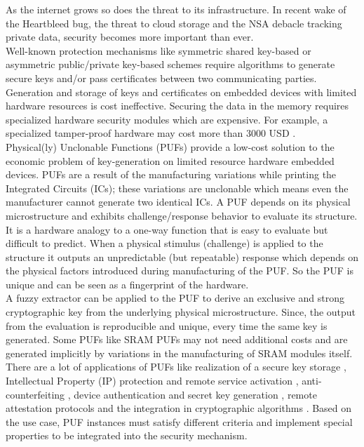 As the internet grows so does the threat to its infrastructure.
In recent wake of the Heartbleed bug, the threat to cloud storage and the NSA debacle tracking private data, security becomes more important than ever.\\

Well-known protection mechanisms like symmetric shared key-based or asymmetric public/private key-based schemes require algorithms to generate secure keys and/or pass certificates between two communicating parties. Generation and storage of keys and certificates on embedded devices with limited hardware resources is cost ineffective. Securing the data in the memory requires specialized hardware security modules which are expensive. For example, a specialized tamper-proof hardware may cost more than 3000 USD
\cite{os8}.\\

Physical(ly) Unclonable Functions (PUFs) \cite{os9} provide a low-cost solution to the economic problem of key-generation on limited resource hardware embedded devices. PUFs are a result of the manufacturing variations while printing the Integrated Circuits (ICs); these variations are unclonable which means even the manufacturer cannot generate two identical ICs. A PUF depends on its physical microstructure and exhibits challenge/response behavior to evaluate its structure. It is a hardware analogy to a one-way function that is easy to evaluate but difficult to predict. When a physical stimulus (challenge) is applied to the structure it outputs an unpredictable (but repeatable) response which depends on the physical factors introduced during manufacturing of the PUF. So the PUF is unique and can be seen as a fingerprint of the hardware\cite{15}.\\

A fuzzy extractor \cite{fuzzy} can be applied to the PUF to derive an exclusive and strong cryptographic key from the underlying physical microstructure. Since, the output from the evaluation is reproducible and unique, every time the same key is generated. Some PUFs like SRAM PUFs may not need additional costs and are generated implicitly by variations in the manufacturing of SRAM modules itself.\\

There are a lot of applications of PUFs like realization of a secure key storage \cite{2,3,4}, Intellectual Property (IP) protection and remote service activation \cite{5,11}, anti-counterfeiting \cite{6,7}, device authentication and secret key generation \cite{8,9,10}, remote attestation protocols \cite{12,13} and the integration in cryptographic algorithms \cite{14}. Based on the use case, PUF instances must satisfy different criteria and implement special properties to be integrated
into the security mechanism.\\


